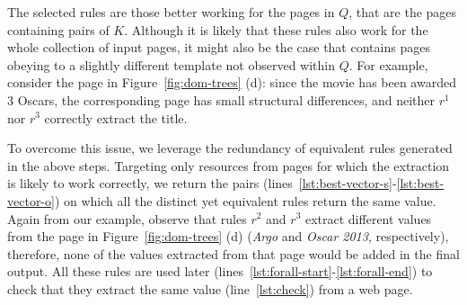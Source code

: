 


The selected rules are those better working for the pages in $Q$, that are the pages containing pairs of $K$. Although it is likely that these rules also work for the whole collection of input pages, it might also be the case that {\allpages} contains pages obeying to a slightly different template not observed within $Q$. For example, consider the page in Figure~\ref{fig:dom-trees} (d): since the movie has been awarded 3 Oscars, the corresponding page has small structural differences, and neither $r^1$ nor $r^3$ correctly extract the title. 


To overcome this issue, we leverage the redundancy of equivalent rules generated in the above steps. Targeting only resources from pages for which the extraction is likely to work correctly, we return the pairs (lines~\ref{lst:best-vector-s}-\ref{lst:best-vector-o}) on which all the distinct yet equivalent rules return the same value. Again from our example, observe that rules $r^2$ and $r^3$ extract different values from the page in Figure~\ref{fig:dom-trees} (d) ({\em Argo} and {\em Oscar 2013}, respectively), therefore, none of the values extracted from that page would be added in the final output. 
All these rules are used later (lines~\ref{lst:forall-start}-\ref{lst:forall-end}) to check that they extract the same value (line~\ref{lst:check}) from a web page.




